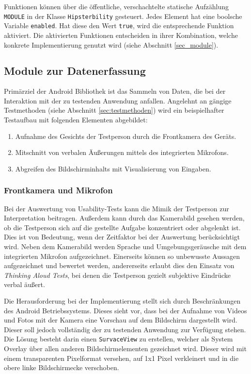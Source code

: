 Funktionen können über die öffentliche, verschachtelte statische Aufzählung \texttt{MODULE} in der Klasse \texttt{Hipsterbility} gesteuert.
Jedes Element hat eine boolsche Variable \texttt{enabled}.
Hat diese den Wert \texttt{true}, wird die entsprechende Funktion aktiviert.
Die aktivierten Funktionen entscheiden in ihrer Kombination, welche konkrete Implementierung genutzt wird (siehe Abschnitt \ref{sec_module}).

\subsection{Module zur Datenerfassung \label{sec:module}}
Primärziel der Android Bibliothek ist das Sammeln von Daten, die bei der Interaktion mit der zu testenden Anwendung anfallen.
Angelehnt an gängige Testmethoden (siehe Abschnitt \ref{sec:testmethoden}) wird ein beispielhafter Testaufbau mit folgenden Elementen abgebildet:
\begin{enumerate}
	\item Aufnahme des Gesichts der Testperson durch die Frontkamera des Geräts.
	\item Mitschnitt von verbalen Äußerungen mittels des integrierten Mikrofons.
	\item Abgreifen des Bildschirminhalts mit Visualisierung von Eingaben.
\end{enumerate}


\subsubsection{Frontkamera und Mikrofon}
Bei der Auswertung von Usability-Tests kann die Mimik der Testperson zur Interpretation beitragen.
Außerdem kann durch das Kamerabild gesehen werden, ob die Testperson sich auf die gestellte Aufgabe konzentriert oder abgelenkt ist.
Dies ist von Bedeutung, wenn der Zeitfaktor bei der Auswertung berücksichtigt wird.
Neben dem Kamerabild werden Sprache und Umgebungsgeräusche mit dem integrierten Mikrofon aufgezeichnet.
Einerseits können so unbewusste Aussagen aufgezeichnet und bewertet werden, andererseits erlaubt dies den Einsatz von \emph{Thinking Aloud Tests}, bei denen die Testperson gezielt subjektive Eindrücke verbal äußert.  %

Die Herausforderung bei der Implementierung stellt sich durch Beschränkungen des Android Betriebssystems.
Dieses sieht vor, dass bei der Aufnahme von Videos und Fotos mit der Kamera eine Vorschau auf dem Bildschirm dargestellt wird.
Dieser soll jedoch vollständig der zu testenden Anwendung zur Verfügung stehen.
Die Lösung besteht darin einen \texttt{SurvaceView} zu erstellen, welcher als System Overlay über allen anderen Bildschirmelementen gezeichnet wird. 
Dieser wird mit einem transparenten Pixelformat versehen, auf 1x1 Pixel verkleinert und in die obere linke Bildschirmecke verschoben.

